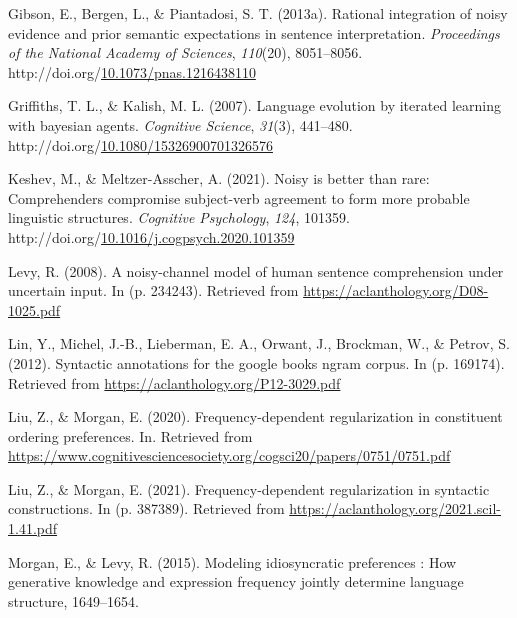 \documentclass[10pt, letterpaper]{article}
\newenvironment{CSLReferences}%
  {}%
  {\par}
\begin{document}
\begin{CSLReferences}{1}{0}
\leavevmode{}%
Gibson, E., Bergen, L., \& Piantadosi, S. T. (2013a). Rational
integration of noisy evidence and prior semantic expectations in
sentence interpretation. \emph{Proceedings of the National Academy of
Sciences}, \emph{110}(20), 8051--8056.
http://doi.org/\href{https://doi.org/10.1073/pnas.1216438110}{10.1073/pnas.1216438110}

\leavevmode{}%
Griffiths, T. L., \& Kalish, M. L. (2007). Language evolution by
iterated learning with bayesian agents. \emph{Cognitive Science},
\emph{31}(3), 441--480.
http://doi.org/\href{https://doi.org/10.1080/15326900701326576}{10.1080/15326900701326576}

\leavevmode{}%
Keshev, M., \& Meltzer-Asscher, A. (2021). Noisy is better than rare:
Comprehenders compromise subject-verb agreement to form more probable
linguistic structures. \emph{Cognitive Psychology}, \emph{124}, 101359.
http://doi.org/\href{https://doi.org/10.1016/j.cogpsych.2020.101359}{10.1016/j.cogpsych.2020.101359}

\leavevmode{}%
Levy, R. (2008). A noisy-channel model of human sentence comprehension
under uncertain input. In (p. 234243). Retrieved from
\url{https://aclanthology.org/D08-1025.pdf}

\leavevmode{}%
Lin, Y., Michel, J.-B., Lieberman, E. A., Orwant, J., Brockman, W., \&
Petrov, S. (2012). Syntactic annotations for the google books ngram
corpus. In (p. 169174). Retrieved from
\url{https://aclanthology.org/P12-3029.pdf}

\leavevmode{}%
Liu, Z., \& Morgan, E. (2020). Frequency-dependent regularization in
constituent ordering preferences. In. Retrieved from
\url{https://www.cognitivesciencesociety.org/cogsci20/papers/0751/0751.pdf}

\leavevmode{}%
Liu, Z., \& Morgan, E. (2021). Frequency-dependent regularization in
syntactic constructions. In (p. 387389). Retrieved from
\url{https://aclanthology.org/2021.scil-1.41.pdf}

\leavevmode{}%
Morgan, E., \& Levy, R. (2015). Modeling idiosyncratic preferences : How
generative knowledge and expression frequency jointly determine language
structure, 1649--1654.


\end{CSLReferences}
\end{document}
